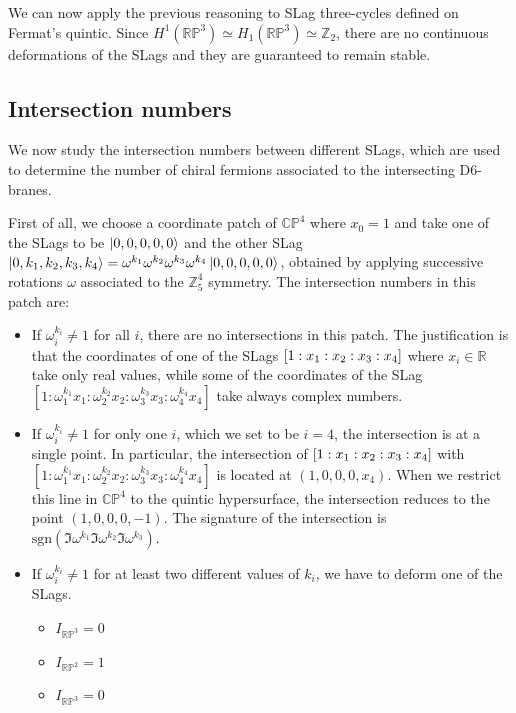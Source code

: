 We can now apply the previous reasoning to SLag three-cycles defined on Fermat's quintic.
Since $H^1(\mathbb{RP}^3)\simeq H_1(\mathbb{RP}^3)\simeq\mathbb Z_2$, there are no continuous deformations of the
SLags and they are guaranteed to remain stable.

\subsection{Intersection numbers}
We now study the intersection numbers between different SLags, which are used to determine the number 
of chiral fermions associated to the intersecting D6-branes.

First of all, we choose a coordinate patch of $\mathbb{CP}^4$ where $x_0=1$ and take one of the SLags to be $\ket{0,0,0,0,0}$
and the other SLag $\ket{0,k_1,k_2,k_3,k_4}=\omega^{k_1}\omega^{k_2}\omega^{k_3}\omega^{k_4}\ket{0,0,0,0,0}$, obtained by applying successive rotations $\omega$ associated to the $\mathbb Z_5^4$ symmetry.
The intersection numbers in this patch are:
\begin{itemize}
  \item If $\omega_i^{k_i}\neq 1$ for all $i$, there are no intersections in this patch. 
    The justification is that the coordinates of one of the SLags $\qty[1:x_1:x_2:x_3:x_4]$ where $x_i\in\mathbb R$ take only real values,
    while some of the coordinates of the SLag $[1:\omega_1^{k_1}x_1:\omega_2^{k_2}x_2:\omega_3^{k_3}x_3:\omega_4^{k_4}x_4]$ take
    always complex numbers.

  \item If $\omega_i^{k_i}\neq 1$ for only one $i$, which we set to be $i=4$, the intersection
    is at a single point.
    In particular, the intersection of $\qty[1:x_1:x_2:x_3:x_4]$ with $[1:\omega_1^{k_1}x_1:\omega_2^{k_2}x_2:\omega_3^{k_3}x_3:\omega_4^{k_4}x_4]$
    is located at $(1,0,0,0,x_4)$.%
    When we restrict this line in $\mathbb{CP}^4$ to the quintic hypersurface, the intersection reduces to the point $(1,0,0,0,-1)$.
    The signature of the intersection is $\mathrm{sgn}(\Im \omega^{k_1}\Im\omega^{k_2}\Im\omega^{k_3})$. 

  \item If $\omega_i^{k_i}\neq 1$ for at least two different values of $k_i$, we have to deform one of the SLags.
    \begin{itemize}
  \item
    $I_{\mathbb{RP}^3}=0$
  \item 
    $I_{\mathbb{RP}^2}=1$
  \item 
    $I_{\mathbb{RP}^3}=0$
    \end{itemize}
\end{itemize}

